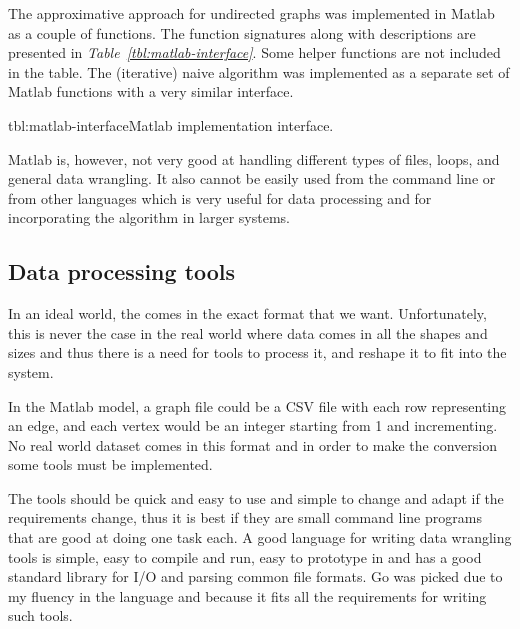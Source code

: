 \documentclass[12pt]{report}
\begin{document}
The approximative approach for undirected graphs was implemented in Matlab as a
couple of functions. The function signatures along with descriptions are
presented in \emph{Table~\ref{tbl:matlab-interface}}. Some helper functions are not
included in the table. The (iterative) naive algorithm was implemented as a
separate set of Matlab functions with a very similar interface.

\begin{methodListC}{tbl:matlab-interface}{Matlab implementation interface.}
\end{methodListC}

Matlab is, however, not very good at handling different types of files, loops,
and general data wrangling. It also cannot be easily used from the command line
or from other languages which is very useful for data processing and for
incorporating the algorithm in larger systems.

\subsection{Data processing tools}

In an ideal world, the comes in the exact format that we want. Unfortunately,
this is never the case in the real world where data comes in all the shapes and
sizes and thus there is a need for tools to process it, and reshape it to fit
into the system.


In the Matlab model, a graph file could be a CSV file with each row representing
an edge, and each vertex would be an integer starting from 1 and incrementing.
No real world dataset comes in this format and in order to make the conversion
some tools must be implemented.


The tools should be quick and easy to use and simple to change and adapt if the
requirements change, thus it is best if they are small command line programs
that are good at doing one task each. A good language for writing data wrangling
tools is simple, easy to compile and run, easy to prototype in and has a good
standard library for I/O and parsing common file formats. Go was picked due to
my fluency in the language and because it fits all the requirements for writing
such tools.
\end{document}
